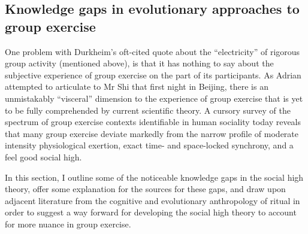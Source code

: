 \begin{CJK}{UTF8}{gbsn}
\subsection{Knowledge gaps in evolutionary approaches to group exercise}

One problem with Durkheim's oft-cited quote about the ``electricity'' of rigorous group activity (mentioned above), is that it has nothing to say about the subjective experience of group exercise on the part of its participants.  As Adrian attempted to articulate to Mr Shi that first night in Beijing, there is an unmistakably ``visceral'' dimension to the experience of group exercise that is yet to be fully comprehended by current scientific theory. A cursory survey of the spectrum of group exercise contexts identifiable in human sociality today reveals that many group exercise deviate markedly from the narrow profile of moderate intensity physiological exertion, exact time- and space-locked synchrony, and a feel good social high.

In this section, I outline some of the noticeable knowledge gaps in the social high theory, offer some explanation for the sources for these gaps, and draw upon adjacent literature from the cognitive and evolutionary anthropology of ritual in order to suggest a way forward for developing the social high theory to account for more nuance in group exercise.



\end{CJK}
